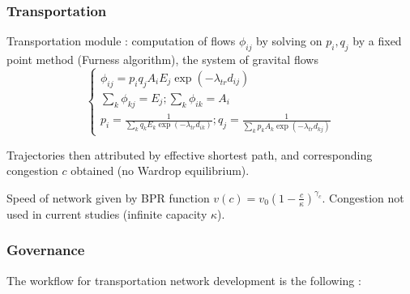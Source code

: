 \subsubsection{Transportation}



Transportation module : computation of flows $\phi_{ij}$ by solving on $p_i,q_j$ by a fixed point method (Furness algorithm), the system of gravital flows
\[
\begin{cases}
\phi_{ij} = p_i q_j A_i E_j \exp{\left(-\lambda_{tr} d_{ij}\right)}\\
\sum_k \phi_{kj} = E_j ; \sum_k \phi_{ik} = A_i\\
p_i = \frac{1}{\sum_k{q_k E_k \exp{(-\lambda_{tr}d_{ik})}}} ; q_j = \frac{1}{\sum_k{p_k A_k \exp{(-\lambda_{tr}d_{kj})}}} 
\end{cases}
\]

Trajectories then attributed by effective shortest path, and corresponding congestion $c$ obtained (no Wardrop equilibrium). 

Speed of network given by BPR function $v(c) = v_0 \left(1 - \frac{c}{\kappa}\right)^{\gamma_c}$. Congestion not used in current studies (infinite capacity $\kappa$).





\subsubsection{Governance}




The workflow for transportation network development is the following :

